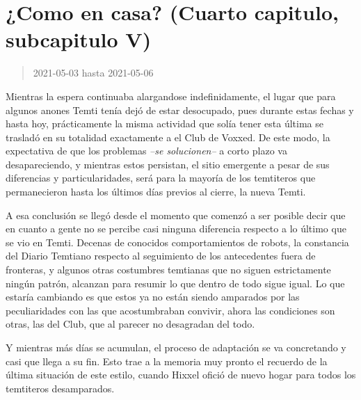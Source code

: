 \documentclass[
  spanish,
]{book}
\begin{document}
\hypertarget{como-en-casa-cuarto-capitulo-subcapitulo-v}{%
\section{¿Como en casa? (Cuarto capitulo, subcapitulo V)}\label{como-en-casa-cuarto-capitulo-subcapitulo-v}}

\begin{quote}
2021-05-03 hasta 2021-05-06
\end{quote}

Mientras la espera continuaba alargandose indefinidamente, el lugar que para algunos anones Temti tenía dejó de estar desocupado, pues durante estas fechas y hasta hoy, prácticamente la misma actividad que solía tener esta última se trasladó en su totalidad exactamente a el Club de Voxxed. De este modo, la expectativa de que los problemas \emph{--se solucionen--} a corto plazo va desapareciendo, y mientras estos persistan, el sitio emergente a pesar de sus diferencias y particularidades, será para la mayoría de los temtiteros que permanecieron hasta los últimos días previos al cierre, la nueva Temti.

A esa conclusión se llegó desde el momento que comenzó a ser posible decir que en cuanto a gente no se percibe casi ninguna diferencia respecto a lo último que se vio en Temti. Decenas de conocidos comportamientos de robots, la constancia del Diario Temtiano respecto al seguimiento de los antecedentes fuera de fronteras, y algunos otras costumbres temtianas que no siguen estrictamente ningún patrón, alcanzan para resumir lo que dentro de todo sigue igual. Lo que estaría cambiando es que estos ya no están siendo amparados por las peculiaridades con las que acostumbraban convivir, ahora las condiciones son otras, las del Club, que al parecer no desagradan del todo.

Y mientras más días se acumulan, el proceso de adaptación se va concretando y casi que llega a su fin. Esto trae a la memoria muy pronto el recuerdo de la última situación de este estilo, cuando Hixxel ofició de nuevo hogar para todos los temtiteros desamparados.
\end{document}
